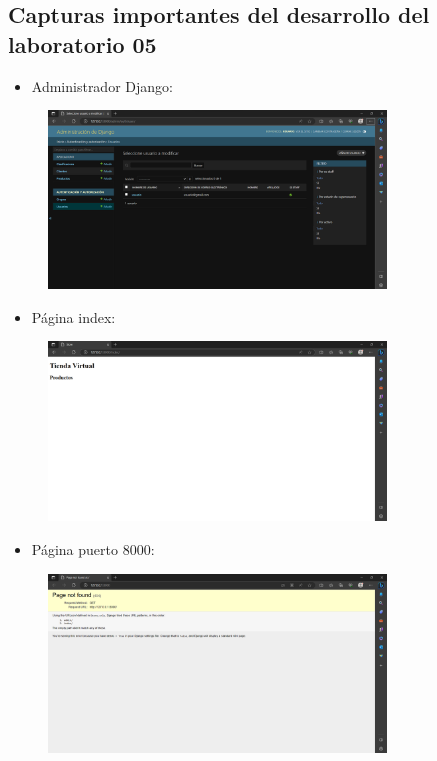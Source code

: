 \subsection{Capturas importantes del desarrollo del laboratorio 05}
\begin{itemize}	
	\item Administrador Django:
\end{itemize}	
\begin{figure}[H]
	\centering
	\includegraphics[width=0.8\textwidth,keepaspectratio]{img/AdministradorDjango.png}
\end{figure}
\begin{itemize}	
	\item Página index:
\end{itemize}	
\begin{figure}[H]
	\centering
	\includegraphics[width=0.8\textwidth,keepaspectratio]{img/Pagina-Index.png}
\end{figure}
\begin{itemize}	
	\item Página puerto 8000:
\end{itemize}	
\begin{figure}[H]
	\centering
	\includegraphics[width=0.8\textwidth,keepaspectratio]{img/Pagina-puerto8000.png}
\end{figure}

